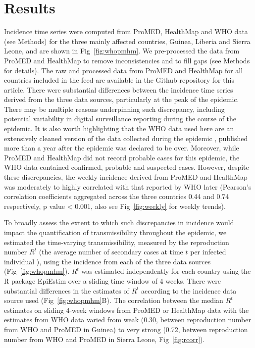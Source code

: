 \documentclass[9pt,twocolumn,twoside,lineno]{pnas-new}
\begin{document}
\section*{Results}

Incidence time series were computed from ProMED, HealthMap and WHO data
(see Methods) for the three mainly affected countries, Guinea,
Liberia and Sierra Leone, and are shown in Fig~\ref{fig:whopmhm}. We
pre-processed the data from ProMED and HealthMap to
remove inconsistencies and to fill gaps (see Methods for details).
The raw and
processed data from ProMED and HealthMap for all countries
included in the feed are available in the Github repository for this
article. There were
substantial differences between the incidence time series derived from
the three data sources, particularly at the peak of the epidemic. There
may be multiple reasons underpinning such discrepancy, including
potential variability in digital surveillance reporting during the
course of the epidemic. It is also worth highlighting that the WHO data
used here are an extensively cleaned version of the data collected
during the epidemic \cite{who2014ebola, team2015west}, published
more than a year after the epidemic was declared to be
over. Moreover, while ProMED and HealthMap did not record
probable cases for this epidemic, the WHO data contained confirmed,
probable and suspected cases. However,
despite these discrepancies, the weekly incidence derived from ProMED
and HealthMap was moderately to highly correlated with that reported by
WHO later (Pearson's correlation coefficients aggregated across the
three countries 0.44 and 0.74 respectively, p value \textless{} 0.001,
also see Fig~\ref{fig:weekly} for weekly trends).

To broadly assess the extent to which such discrepancies in incidence
would impact the quantification of transmissibility throughout the
epidemic, we estimated the time-varying transmissibility, measured by
the reproduction number \(R^t\) (the average number of secondary cases
at time \(t\) per infected individual \cite{fraser2007estimating}), 
using the incidence
from each of the three data sources (Fig~\ref{fig:whopmhm}). 
\(R^t\) was estimated
independently for each country using the R package EpiEstim
\cite{cori2013new} over a sliding time window of 4 weeks. There were
substantial differences in the estimates of \(R^t\) according to the
incidence data source used (Fig~\ref{fig:whopmhm}B). The correlation between the
median $R^t$ estimates on sliding 4-week windows from ProMED or HealthMap
data with the estimates from WHO data varied from weak (0.30, between
reproduction number from WHO and ProMED in Guinea) to very strong
(0.72, between reproduction number from WHO and ProMED in Sierra
Leone, Fig~\ref{fig:rcorr}).
\end{document}
